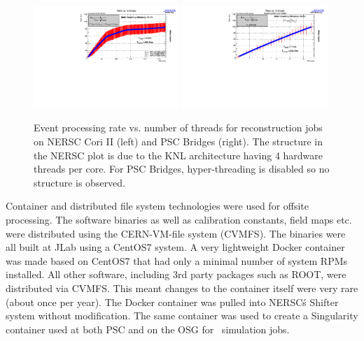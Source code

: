 \begin{figure}[h!]\centering
\includegraphics[width=0.49\textwidth]{figures/production_offsite_rate_vs_nthreads_NERSC.pdf}
\includegraphics[width=0.49\textwidth]{figures/production_offsite_rate_vs_nthreads_PSC.pdf}
\caption[]{\label{fig:production_offsite_rate_vs_nthreads_NERSC}Event processing rate vs. number of threads for reconstruction jobs on NERSC Cori II (left) and PSC Bridges (right). The structure in the NERSC plot is due to the KNL architecture having 4 hardware threads per core. For PSC Bridges, hyper-threading is disabled so no structure is observed.} 
\end{figure}

Container and distributed file system technologies were used for offsite processing. The software binaries as well as calibration constants, field maps etc. were distributed using the CERN-VM-file system (CVMFS). The binaries were all built at JLab using a CentOS7 system. A very lightweight Docker container was made based on CentOS7 that had only a minimal number of system RPMs installed. All other software, including 3rd party packages such as ROOT, were distributed via CVMFS. This meant changes to the container itself were very rare (about once per year). The Docker container was pulled into NERSC\'s Shifter system without modification. The same container was used to create a Singularity container used at both PSC and on the OSG for \GX~simulation jobs.

